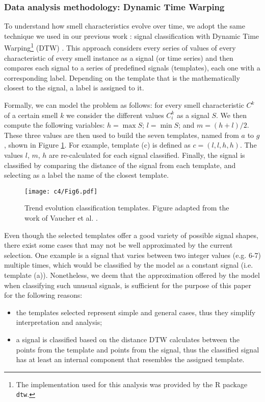 \subsubsection{Data analysis methodology: Dynamic Time Warping}\label{c4:sec:methodology-rq1.1}
To understand how smell characteristics evolve over time, we adopt the same technique we used in our previous work \cite{Sas2019,Vaucher2009}: signal classification with Dynamic Time Warping\footnote{The implementation used for this analysis was provided by the R package \texttt{dtw}.} (DTW) \cite{Kruskal1983}.
This approach considers every series of values of every characteristic of every smell instance as a signal (or time series) and then compares each signal to a series of predefined signals (templates), each one with a corresponding label. 
Depending on the template that is the mathematically closest to the signal, a label is assigned to it.

Formally, we can model the problem as follows: for every smell characteristic $C^{k}$ of a certain smell $k$ we consider the different values $C^{k}_i$ as a signal $S$. We then compute the following variables: $h = \max S$; $l = \min S$; and $m = (h+l)/2$.
These three values are then used to build the seven templates, named from $a$ to $g$, shown in Figure \ref{c4:fig:classification-templates}. For example, template (c) is defined as $c = (l, l, h, h)$.
The values $l$, $m$, $h$ are re-calculated for each signal classified.
Finally, the signal is classified by comparing the distance of the signal from each template, and selecting as a label the name of the closest template. 

\begin{figure}[h]
    \centering
    \texttt{[image: c4/Fig6.pdf]}
    \caption{Trend evolution classification templates. Figure adapted from the work of Vaucher et al. \cite{Vaucher2009}.}\label{c4:fig:classification-templates}
\end{figure}

Even though the selected templates offer a good variety of possible signal shapes, there exist some cases that may not be well approximated by the current selection.
One example is a signal that varies between two integer values (e.g. 6-7) multiple times, which would be classified by the model as a constant signal (i.e. template (a)).
Nonetheless, we deem that the approximation offered by the model when classifying such unusual signals, is sufficient for the purpose of this paper for the following reasons:
\begin{itemize}
    \item the templates selected represent simple and general cases, thus they simplify interpretation and analysis;
    \item a signal is classified based on the distance DTW calculates between the points from the template and points from the signal, thus the classified signal has at least an internal component that resembles the assigned template.
\end{itemize}


